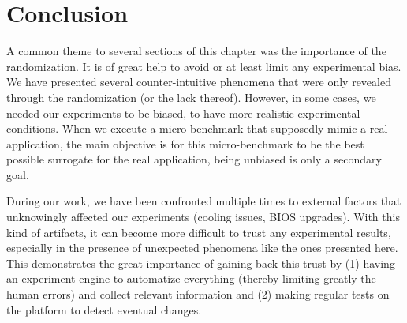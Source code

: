 	\section{Conclusion}
        A common theme to several sections of this chapter was the importance of the randomization. It is of great help
        to avoid or at least limit any experimental bias. We have presented several counter-intuitive phenomena that
        were only revealed through the randomization (or the lack thereof). However, in some cases, we needed our
        experiments to be biased, to have more realistic experimental conditions. When we execute a micro-benchmark that
        supposedly mimic a real application, the main objective is for this micro-benchmark to be the best possible
        surrogate for the real application, being unbiased is only a secondary goal.

        During our work, we have been confronted multiple times to external factors that unknowingly affected our
        experiments (\eg cooling issues, BIOS upgrades). With this kind of artifacts, it can become more difficult to
        trust any experimental results, especially in the presence of unexpected phenomena like the ones presented
        here. This demonstrates the great importance of gaining back this trust by (1) having an experiment engine to
        automatize everything (thereby limiting greatly the human errors) and collect relevant information and (2)
        making regular tests on the platform to detect eventual changes.

